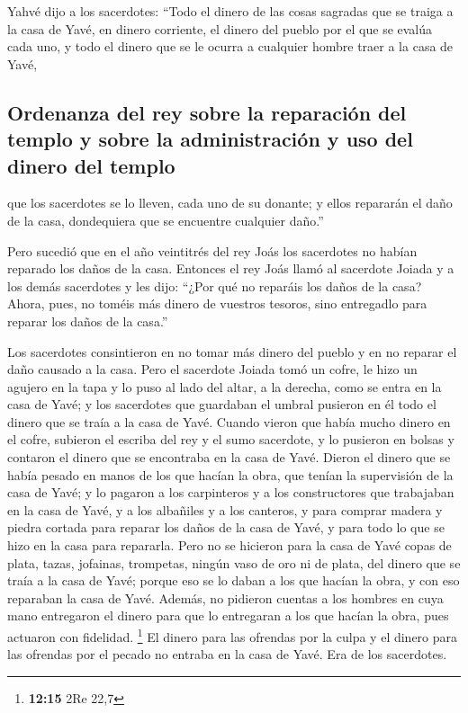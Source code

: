  Yahvé dijo a los sacerdotes: ``Todo el dinero de las
cosas sagradas que se traiga a la casa de Yavé, en dinero corriente, el
dinero del pueblo por el que se evalúa cada uno, y todo el dinero que se
le ocurra a cualquier hombre traer a la casa de Yavé,

\hypertarget{ordenanza-del-rey-sobre-la-reparaciuxf3n-del-templo-y-sobre-la-administraciuxf3n-y-uso-del-dinero-del-templo}{%
\subsection{Ordenanza del rey sobre la reparación del templo y sobre la
administración y uso del dinero del
templo}\label{ordenanza-del-rey-sobre-la-reparaciuxf3n-del-templo-y-sobre-la-administraciuxf3n-y-uso-del-dinero-del-templo}}

 que los sacerdotes se lo lleven, cada uno de su donante;
y ellos repararán el daño de la casa, dondequiera que se encuentre
cualquier daño.''

 Pero sucedió que en el año veintitrés del rey Joás los
sacerdotes no habían reparado los daños de la casa. 
Entonces el rey Joás llamó al sacerdote Joiada y a los demás sacerdotes
y les dijo: ``¿Por qué no reparáis los daños de la casa? Ahora, pues, no
toméis más dinero de vuestros tesoros, sino entregadlo para reparar los
daños de la casa.''

 Los sacerdotes consintieron en no tomar más dinero del
pueblo y en no reparar el daño causado a la casa.  Pero el
sacerdote Joiada tomó un cofre, le hizo un agujero en la tapa y lo puso
al lado del altar, a la derecha, como se entra en la casa de Yavé; y los
sacerdotes que guardaban el umbral pusieron en él todo el dinero que se
traía a la casa de Yavé.  Cuando vieron que había mucho
dinero en el cofre, subieron el escriba del rey y el sumo sacerdote, y
lo pusieron en bolsas y contaron el dinero que se encontraba en la casa
de Yavé.  Dieron el dinero que se había pesado en manos
de los que hacían la obra, que tenían la supervisión de la casa de Yavé;
y lo pagaron a los carpinteros y a los constructores que trabajaban en
la casa de Yavé,  y a los albañiles y a los canteros, y
para comprar madera y piedra cortada para reparar los daños de la casa
de Yavé, y para todo lo que se hizo en la casa para repararla.
 Pero no se hicieron para la casa de Yavé copas de plata,
tazas, jofainas, trompetas, ningún vaso de oro ni de plata, del dinero
que se traía a la casa de Yavé;  porque eso se lo daban a
los que hacían la obra, y con eso reparaban la casa de Yavé.
 Además, no pidieron cuentas a los hombres en cuya mano
entregaron el dinero para que lo entregaran a los que hacían la obra,
pues actuaron con fidelidad. \footnote{\textbf{12:15} 2Re 22,7}
 El dinero para las ofrendas por la culpa y el dinero
para las ofrendas por el pecado no entraba en la casa de Yavé. Era de
los sacerdotes.


